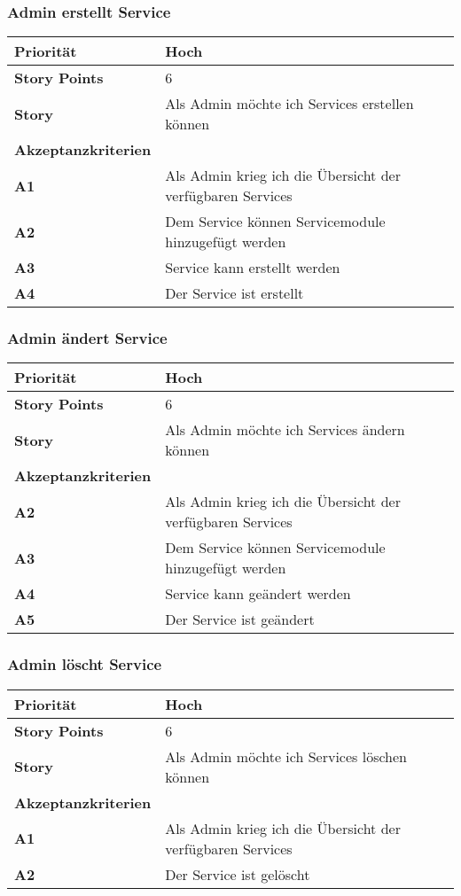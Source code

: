  \subsubsection{Admin erstellt Service}
 \begin{tabularx}{\linewidth}{l X}
  \textbf{Priorität} & Hoch\\
  \hline
  \textbf{Story Points} & 6\\
  \hline
  \textbf{Story}& Als Admin möchte ich Services erstellen können\\
  \hline
    \textbf{Akzeptanzkriterien} & \\
  \hline
  \textbf{A1} & Als Admin krieg ich die Übersicht der verfügbaren Services\\
  \hline
    \textbf{A2} & Dem Service können Servicemodule hinzugefügt werden\\
  \hline
  \textbf{A3} & Service kann erstellt werden\\
  \hline
    \textbf{A4} & Der Service ist erstellt\\
  \hline
 \end{tabularx}
 
 \subsubsection{Admin ändert Service}
 \begin{tabularx}{\linewidth}{l X}
  \textbf{Priorität} & Hoch\\
  \hline
  \textbf{Story Points} & 6\\
  \hline
  \textbf{Story}& Als Admin möchte ich Services ändern können\\
  \hline
    \textbf{Akzeptanzkriterien} & \\
    \hline
  \textbf{A2} & Als Admin krieg ich die Übersicht der verfügbaren Services\\
  \hline
    \textbf{A3} & Dem Service können Servicemodule hinzugefügt werden\\
  \hline
  \textbf{A4} & Service kann geändert werden\\
  \hline
    \textbf{A5} & Der Service ist geändert\\
  \hline
 \end{tabularx}

 \subsubsection{Admin löscht Service}
 
  \begin{tabularx}{\linewidth}{l X}
  \textbf{Priorität} & Hoch\\
  \hline
  \textbf{Story Points} & 6\\
  \hline
  \textbf{Story}& Als Admin möchte ich Services löschen können\\
  \hline
    \textbf{Akzeptanzkriterien} & \\
     \hline
   \textbf{A1} & Als Admin krieg ich die Übersicht der verfügbaren Services\\
   \hline
    \textbf{A2} & Der Service ist gelöscht\\
  \hline
 \end{tabularx}
